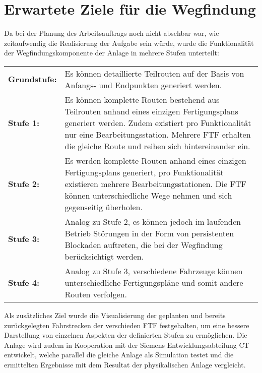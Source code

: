	

\section{Erwartete Ziele für die Wegfindung}
	\label{Ziele_Wegfindung}
	Da bei der Planung des Arbeitsauftrags noch nicht absehbar war, wie zeitaufwendig die Realisierung der Aufgabe sein würde, wurde die Funktionalität der Wegfindungskomponente der Anlage in mehrere Stufen unterteilt:\\
	
	\begin{tabular}{p{2.5cm} p{10cm}}
		\textbf{Grundstufe:} & Es können detaillierte Teilrouten auf der Basis von Anfangs- und Endpunkten generiert werden.\\[0.25cm]
		\textbf{Stufe 1:} & Es können komplette Routen bestehend aus Teilrouten anhand eines einzigen Fertigungsplans generiert werden. Zudem existiert pro Funktionalität nur eine Bearbeitungsstation. Mehrere \ac{FTF} erhalten die gleiche Route und reihen sich hintereinander ein.\\[0.25cm]
		\textbf{Stufe 2:} & Es werden komplette Routen anhand eines einzigen Fertigungsplans generiert, pro Funktionalität existieren mehrere Bearbeitungsstationen. Die \ac{FTF} können unterschiedliche Wege nehmen und sich gegenseitig überholen.\\[0.25cm]
		\textbf{Stufe 3:} & Analog zu Stufe 2, es können jedoch im laufenden Betrieb Störungen in der Form von persistenten Blockaden auftreten, die bei der Wegfindung berücksichtigt werden.\\[0.25cm]
		\textbf{Stufe 4:} & Analog zu Stufe 3, verschiedene Fahrzeuge können unterschiedliche Fertigungspläne und somit andere Routen verfolgen.\\[0.25cm]
	\end{tabular}
	
	Als zusätzliches Ziel wurde die Visualisierung der geplanten und bereits zurückgelegten Fahrstrecken der verschieden \ac{FTF} festgehalten, um eine bessere Darstellung von einzelnen Aspekten der definierten Stufen zu ermöglichen. Die Anlage wird zudem in Kooperation mit der Siemens Entwicklungsabteilung \ac{CT} entwickelt, welche parallel die gleiche Anlage als Simulation testet und die ermittelten Ergebnisse mit dem Resultat der physikalischen Anlage vergleicht.
	